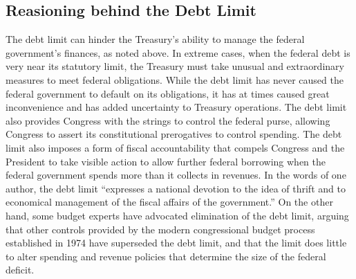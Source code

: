\subsection{Reasioning behind the Debt Limit}
The debt limit can hinder the Treasury’s ability to manage the federal government’s finances, as noted above. In extreme cases, when the federal debt is very near its statutory limit, the Treasury must take unusual and extraordinary measures to meet federal obligations. While the debt limit has never caused the federal government to default on its obligations, it has at times caused great inconvenience and has added uncertainty to Treasury operations.
\newline \newline
The debt limit also provides Congress with the strings to control the federal purse, allowing Congress to assert its constitutional prerogatives to control spending. The debt limit also imposes a form of fiscal accountability that compels Congress and the President to take visible action to allow further federal borrowing when the federal government spends more than it collects in revenues. In the words of one author, the debt limit “expresses a national devotion to the idea of thrift and to economical management of the fiscal affairs of the government.” On the other hand, some budget experts have advocated elimination of the debt limit, arguing that other controls provided by the modern congressional budget process established in 1974 have superseded the debt limit, and that the limit does little to alter spending and revenue policies that determine the size of the federal deficit.